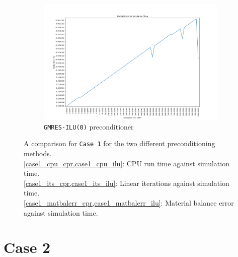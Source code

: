 \begin{figure}
\begin{subfigure}{.5\textwidth}
  \includegraphics[width=1.1\linewidth]{figures/case1/ilu/matbalerr_time.png_reduced.png}
  \caption{\texttt{GMRES-ILU(0)} preconditioner}
	\label{case1_matbalerr_ilu}
\end{subfigure}
\caption[caption]{A comparison for \texttt{Case 1} for the two different preconditioning methods.\\\hspace{\textwidth}
		\cref{case1_cpu_cpr,case1_cpu_ilu}: CPU run time against simulation time. \\\hspace{\textwidth}
		\cref{case1_its_cpr,case1_its_ilu}: Linear iterations against simulation time.\\\hspace{\textwidth}
		\cref{case1_matbalerr_cpr,case1_matbalerr_ilu}: Material balance error against simulation time.}
\label{case1_param}
\end{figure}
\clearpage

\section{Case 2}

